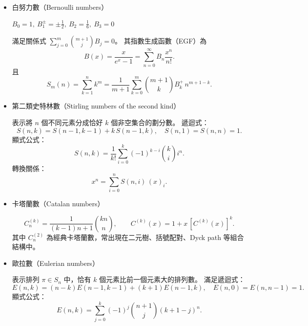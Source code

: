 \begin{itemize}
\item 白努力數（Bernoulli numbers）

$B_0=1,\ B_1^{\pm}=\pm\frac{1}{2},\ B_2=\frac{1}{6},\ B_3=0$

滿足關係式 $\displaystyle\sum_{j=0}^m\binom{m+1}{j}B_j=0$。  
其指數生成函數（EGF）為
\[
B(x)=\frac{x}{e^x-1}=\sum_{n=0}^{\infty}B_n\frac{x^n}{n!}.
\]
且
\[
S_m(n)=\sum_{k=1}^{n}k^m=\frac{1}{m+1}\sum_{k=0}^{m}\binom{m+1}{k}B_k^{+}\,n^{m+1-k}.
\]

\item 第二類史特林數（Stirling numbers of the second kind）

表示將 $n$ 個不同元素分成恰好 $k$ 個非空集合的劃分數。  
遞迴式：
\[
S(n,k)=S(n-1,k-1)+k\,S(n-1,k), \quad S(n,1)=S(n,n)=1.
\]
顯式公式：
\[
S(n,k)=\frac{1}{k!}\sum_{i=0}^{k}(-1)^{k-i}\binom{k}{i}i^n.
\]
轉換關係：
\[
x^n=\sum_{i=0}^{n}S(n,i)\,(x)_i.
\]

%

\item 卡塔蘭數（Catalan numbers）

\[
C^{(k)}_n=\frac{1}{(k-1)n+1}\binom{kn}{n},
\qquad
C^{(k)}(x)=1+x\,[C^{(k)}(x)]^k.
\]
其中 $C^{(2)}_n$ 為經典卡塔蘭數，常出現在二元樹、括號配對、Dyck path 等組合結構中。

\item 歐拉數（Eulerian numbers）

表示排列 $\pi\in S_n$ 中，恰有 $k$ 個元素比前一個元素大的排列數。  
滿足遞迴式：
\[
E(n,k)=(n-k)E(n-1,k-1)+(k+1)E(n-1,k),
\quad
E(n,0)=E(n,n-1)=1.
\]
顯式公式：
\[
E(n,k)=\sum_{j=0}^{k}(-1)^j\binom{n+1}{j}(k+1-j)^n.
\]

\end{itemize}
